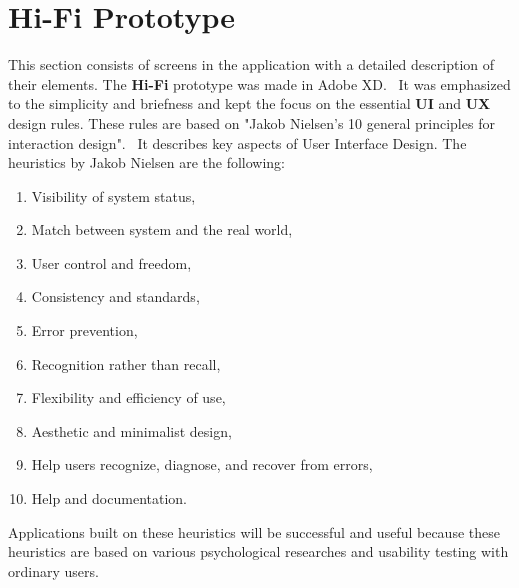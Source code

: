 \section{Hi-Fi Prototype}\label{sec:hi-fi-prototype}
This section consists of screens in the application with a detailed description of their elements.
The \textbf{Hi-Fi} prototype was made in Adobe XD.~\cite{adobeXD}
It was emphasized to the simplicity and briefness and kept the focus on the essential \textbf{UI} and \textbf{UX} design rules.
These rules are based on "Jakob Nielsen's 10 general principles for interaction design".~\cite{nnGroup}
It describes key aspects of User Interface Design.
The heuristics by Jakob Nielsen are the following:
\begin{enumerate}
    \item Visibility of system status,
    \item Match between system and the real world,
    \item User control and freedom,
    \item Consistency and standards,
    \item Error prevention,
    \item Recognition rather than recall,
    \item Flexibility and efficiency of use,
    \item Aesthetic and minimalist design,
    \item Help users recognize, diagnose, and recover from errors,
    \item Help and documentation.
\end{enumerate}

Applications built on these heuristics will be successful and useful because these heuristics are based on various psychological researches and usability testing with ordinary users.














